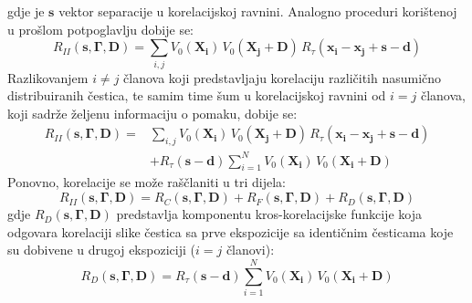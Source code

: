 gdje je $\boldsymbol{s}$ vektor separacije u korelacijskoj ravnini. Analogno proceduri korištenoj u prošlom potpoglavlju dobije se:
\begin{equation}
	R_{II}(\boldsymbol{s}, \boldsymbol{\Gamma}, \boldsymbol{D}) = \sum_{i,j}V_{0}(\boldsymbol{X_{i}})\, V_{0}(\boldsymbol{X_{j}}+\boldsymbol{D})\, R_{\tau}(\boldsymbol{x_{i}}-\boldsymbol{x_{j}}+\boldsymbol{s}-\boldsymbol{d})
	\label{eqn:3.27}
\end{equation}
Razlikovanjem $i\neq j$ članova koji predstavljaju korelaciju različitih nasumično distribuiranih čestica, te samim time šum u korelacijskoj ravnini od $i=j$ članova, koji sadrže željenu informaciju o pomaku, dobije se:
\begin{equation}
	\begin{split}
		R_{\mathit{I}\mathit{I}}(\boldsymbol{s}, \boldsymbol{\Gamma}, \boldsymbol{D}) = &\sum_{i,j}V_{0}(\boldsymbol{X_{i}})\, V_{0}(\boldsymbol{X_{j}}+\boldsymbol{D})\, R_{\tau}(\boldsymbol{x_{i}}-\boldsymbol{x_{j}}+\boldsymbol{s}-\boldsymbol{d})\\ &+ R_{\tau}(\boldsymbol{s}-\boldsymbol{d})\sum_{i=1}^{N}V_{0}(\boldsymbol{X_{i}})\, V_{0}(\boldsymbol{X_{i}}+\boldsymbol{D})
	\end{split}
	\label{eqn:3.28}
\end{equation}
Ponovno, korelacije se može raščlaniti u tri dijela:
\begin{equation}
	R_{II}(\boldsymbol{s}, \boldsymbol{\Gamma}, \boldsymbol{D}) = R_{C}(\boldsymbol{s}, \boldsymbol{\Gamma}, \boldsymbol{D}) + R_{F}(\boldsymbol{s}, \boldsymbol{\Gamma}, \boldsymbol{D}) + R_{D}(\boldsymbol{s}, \boldsymbol{\Gamma}, \boldsymbol{D})
	\label{eqn:3.29}
\end{equation}
gdje $R_{D}(\boldsymbol{s}, \boldsymbol{\Gamma}, \boldsymbol{D})$ predstavlja komponentu kros-korelacijske funkcije koja odgovara korelaciji slike čestica sa prve ekspozicije sa identičnim česticama koje su dobivene u drugoj ekspoziciji ($i=j$ članovi):
\begin{equation}
	R_{D}(\boldsymbol{s}, \boldsymbol{\Gamma}, \boldsymbol{D}) = R_{\tau}(\boldsymbol{s}-\boldsymbol{d})\sum_{i=1}^{N}V_{0}(\boldsymbol{X_{i}})\, V_{0}(\boldsymbol{X_{i}}+\boldsymbol{D})
	\label{eqn:3.30}
\end{equation}
